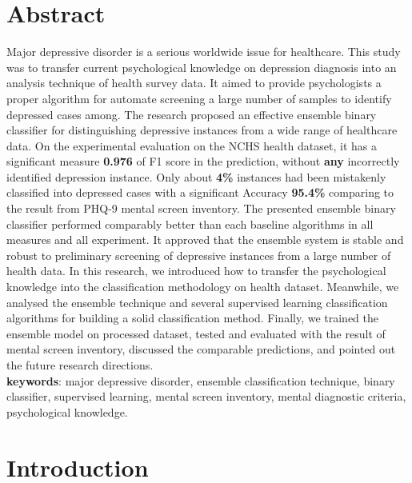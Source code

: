 \documentclass[12pt]{article}
\newlength{\defbaselineskip}
\newcommand{\setlinespacing}[1]%
           {\setlength{\baselineskip}{#1 \defbaselineskip}}
\begin{document}
\setlinespacing{1.3}
\section*{Abstract}
Major depressive disorder is a serious worldwide issue for healthcare. This study was to transfer current psychological knowledge on depression diagnosis into an analysis technique of health survey data. It aimed to provide psychologists a proper algorithm for automate screening a large number of samples to identify depressed cases among. The research proposed an effective ensemble binary classifier for distinguishing depressive instances from a wide range of healthcare data. On the experimental evaluation on the NCHS health dataset, it has a significant measure \textbf{0.976} of F1 score in the prediction, without \textbf{any} incorrectly identified depression instance. Only about \textbf{4\%} instances had been mistakenly classified into depressed cases with a significant Accuracy \textbf{95.4\%} comparing to the result from PHQ-9 mental screen inventory. The presented ensemble binary classifier performed comparably better than each baseline algorithms in all measures and all experiment. It approved that the ensemble system is stable and robust to preliminary screening of depressive instances from a large number of health data. In this research, we introduced how to transfer the psychological knowledge into the classification methodology on health dataset. Meanwhile, we analysed the ensemble technique and several supervised learning classification algorithms for building a solid classification method. Finally, we trained the ensemble model on processed dataset, tested and evaluated with the result of mental screen inventory, discussed the comparable predictions, and pointed out the future research directions. 
%
\vspace{1cm}
\\
\textbf{keywords}:  
	major depressive disorder, ensemble classification technique, binary classifier, supervised learning, mental screen inventory, mental diagnostic criteria, psychological knowledge.


\setlength{\parindent}{0pt}
\setlinespacing{1.3}
\pagebreak
\setcounter{page}{1}
\section{Introduction}
\end{document}
